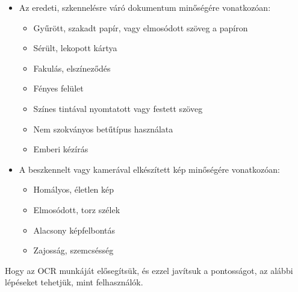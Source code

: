 \documentclass[12pt]{report}
\begin{document}
\begin{itemize}
    \item Az eredeti, szkennelésre váró dokumentum minőségére vonatkozóan:
    \begin{itemize}
        \item Gyűrött, szakadt papír, vagy elmosódott szöveg a papíron
        \item Sérült, lekopott kártya
        \item Fakulás, elszíneződés
        \item Fényes felület
        \item Színes tintával nyomtatott vagy festett szöveg
        \item Nem szokványos betűtípus használata
        \item Emberi kézírás
    \end{itemize}
    \item A beszkennelt vagy kamerával elkészített kép minőségére vonatkozóan:
    \begin{itemize}
        \item Homályos, életlen kép
        \item Elmosódott, torz szélek
        \item Alacsony képfelbontás
        \item Zajosság, szemcsésség
    \end{itemize}
\end{itemize}

\noindent
Hogy az OCR munkáját elősegítsük, és ezzel javítsuk a pontosságot, az alábbi lépéseket tehetjük, mint felhasználók. \cite{ocr_accuracy}
\end{document}
